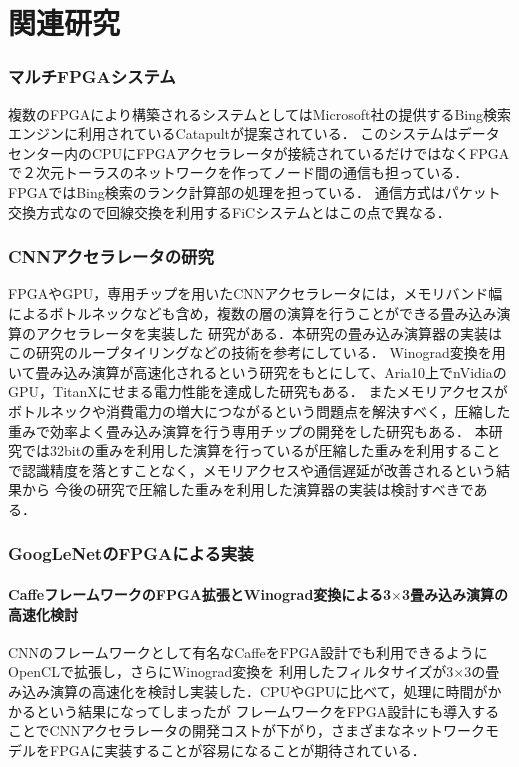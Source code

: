 \chapter{関連研究}
{
\label{chap:survey}

\subsection{マルチFPGAシステム}
複数のFPGAにより構築されるシステムとしてはMicrosoft社の提供するBing検索エンジンに利用されているCatapult\cite{catapult1st}が提案されている．
このシステムはデータセンター内のCPUにFPGAアクセラレータが接続されているだけではなくFPGAで２次元トーラスのネットワークを作ってノード間の通信も担っている．
FPGAではBing検索のランク計算部の処理を担っている．
通信方式はパケット交換方式なので回線交換を利用するFiCシステムとはこの点で異なる．

\subsection{CNNアクセラレータの研究}
FPGAやGPU，専用チップを用いたCNNアクセラレータには，メモリバンド幅によるボトルネックなども含め，複数の層の演算を行うことができる畳み込み演算のアクセラレータを実装した
研究\cite{optimized}がある．本研究の畳み込み演算器の実装はこの研究のループタイリングなどの技術を参考にしている．
Winograd変換を用いて畳み込み演算が高速化されるという研究\cite{winograd}をもとにして、Aria10上でnVidiaのGPU，TitanXにせまる電力性能を達成した研究\cite{aria10}もある．
またメモリアクセスがボトルネックや消費電力の増大につながるという問題点を解決すべく，圧縮した重みで効率よく畳み込み演算を行う専用チップの開発をした研究もある\cite{EIE}．
本研究では32bitの重みを利用した演算を行っているが圧縮した重みを利用することで認識精度を落とすことなく，メモリアクセスや通信遅延が改善されるという結果から
今後の研究で圧縮した重みを利用した演算器の実装は検討すべきである．

\subsection{GoogLeNetのFPGAによる実装}

\subsubsection{CaffeフレームワークのFPGA拡張とWinograd変換による3$\times$3畳み込み演算の高速化検討\cite{caffeinated}}
CNNのフレームワークとして有名なCaffeをFPGA設計でも利用できるようにOpenCLで拡張し，さらにWinograd変換を
利用したフィルタサイズが3$\times$3の畳み込み演算の高速化を検討し実装した．CPUやGPUに比べて，処理に時間がかかるという結果になってしまったが
フレームワークをFPGA設計にも導入することでCNNアクセラレータの開発コストが下がり，さまざまなネットワークモデルをFPGAに実装することが容易になることが期待されている．

}
